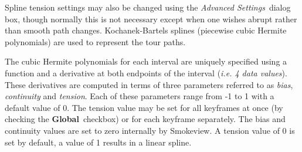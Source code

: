 \documentclass[11pt,twoside]{book}
\begin{document}
Spline tension settings may also be changed using the {\em
Advanced Settings}\ dialog box, though normally this is not
necessary except when one wishes abrupt rather than smooth path
changes. Kochanek-Bartels\cite{Moller:02} splines (piecewise cubic
Hermite polynomials) are used to represent the tour paths.

The cubic Hermite polynomials for each interval are uniquely
specified using a function and a derivative at both endpoints of
the interval ({\em i.e. 4 data values}).  These derivatives are
computed in terms of three parameters referred to as {\em bias},
{\em continuity} and {\em tension}. Each of these parameters range
from -1 to 1 with a default value of 0. The tension value may be
set for all keyframes at once (by checking the {\bf Global}\
checkbox) or for each keyframe separately.  The bias and
continuity values are set to zero internally by Smokeview.  A
tension value of 0 is set by default, a value of 1 results in a
linear spline.
\end{document}
